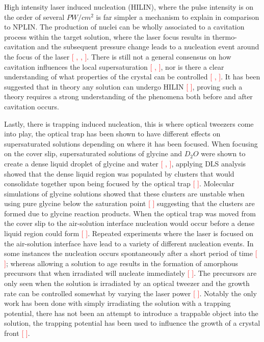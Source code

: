 High intensity laser induced nucleation (HILIN), where the pulse intensity is on the order of several $PW/cm^2$ is far simpler a mechanism to explain in comparison to NPLIN. The production of nuclei can be wholly associated to a cavitation process within the target solution, where the laser focus results in thermo-cavitation and the subsequent pressure change leads to a nucleation event around the focus of the laser \textcolor{red}{[ , , ]}. There is still not a general consensus on how cavitation influences the local supersaturation \textcolor{red}{[ , ]}, nor is there a clear understanding of what properties of the crystal can be controlled \textcolor{red}{[ , ]}. It has been suggested that in theory any solution can undergo HILIN \textcolor{red}{[ ]}, proving such a theory requires a strong understanding of the phenomena both before and after cavitation occurs.  

Lastly, there is trapping induced nucleation, this is where optical tweezers come into play, the optical trap has been shown to have different effects on supersaturated solutions depending on where it has been focused. When focusing on the cover slip, supersaturated solutions of glycine and $D_2O$ were shown to create a dense liquid droplet of glycine and water \textcolor{red}{[ , ]}, applying DLS analysis showed that the dense liquid region was populated by clusters that would consolidate together upon being focused by the optical trap \textcolor{red}{[ ]}. Molecular simulations of glycine solutions showed that these clusters are unstable when using pure glycine below the saturation point \textcolor{red}{[ ]} suggesting that the clusters are formed due to glycine reaction products. When the optical trap was moved from the cover slip to the air-solution interface nucleation would occur before a dense liquid region could form \textcolor{red}{[ ]}. Repeated experiments where the laser is focused on the air-solution interface have lead to a variety of different nucleation events. In some instances the nucleation occurs spontaneously after a short period of time \textcolor{red}{[ ]}; whereas allowing a solution to age results in the formation of amorphous precursors that when irradiated will nucleate immediately \textcolor{red}{[ ]}. The precursors are only seen when the solution is irradiated by an optical tweezer and the growth rate can be controlled somewhat by varying the laser power \textcolor{red}{[ ]}. Notably the only work has been done with simply irradiating the solution with a trapping potential, there has not been an attempt to introduce a trappable object into the solution, the trapping potential has been used to influence the growth of a crystal front \textcolor{red}{[ ]}.

